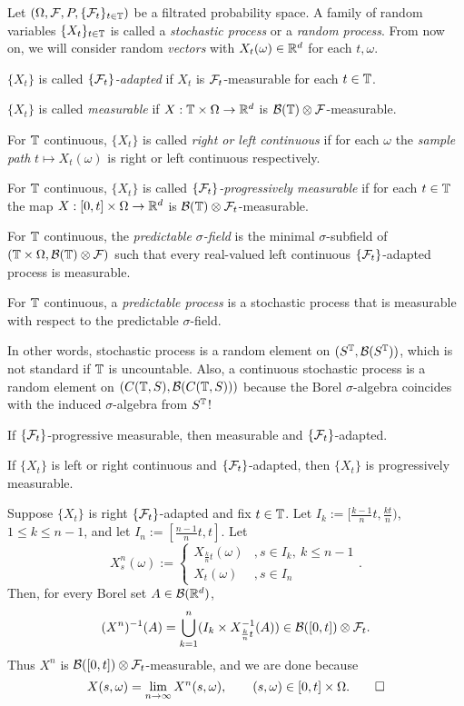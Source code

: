 \documentclass{../../../small}
\begin{document}
\begin{defn}
Let $(\Omega,\mathcal{F},P,\{\mathcal{F}_t\}_{t\in\mathbb{T}})$ be a filtrated probability space.
A family of random variables $\{X_t\}_{t\in\mathbb{T}}$ is called a \emph{stochastic process} or a \emph{random process}.
From now on, we will consider random \emph{vectors} with $X_t(\omega)\in\mathbb{R}^d$ for each $t,\omega$.
\begin{parts}
\item $\{X_t\}$ is called \emph{$\{\mathcal{F}_t\}$-adapted} if $X_t$ is $\mathcal{F}_t$-measurable for each $t\in\mathbb{T}$.
\item $\{X_t\}$ is called \emph{measurable} if $X:\mathbb{T}\times\Omega\to\mathbb{R}^d$ is $\mathcal{B}(\mathbb{T})\otimes\mathcal{F}$-measurable.
\item For $\mathbb{T}$ continuous, $\{X_t\}$ is called \emph{right or left continuous} if for each $\omega$ the \emph{sample path} $t\mapsto X_t(\omega)$ is right or left continuous respectively.
\item For $\mathbb{T}$ continuous, $\{X_t\}$ is called \emph{$\{\mathcal{F}_t\}$-progressively measurable} if for each $t\in\mathbb{T}$ the map $X:[0,t]\times\Omega\to\mathbb{R}^d$ is $\mathcal{B}(\mathbb{T})\otimes\mathcal{F}_t$-measurable.
\item For $\mathbb{T}$ continuous, the \emph{predictable $\sigma$-field} is the minimal $\sigma$-subfield of $(\mathbb{T}\times\Omega,\mathcal{B}(\mathbb{T})\otimes\mathcal{F})$ such that every real-valued left continuous $\{\mathcal{F}_t\}$-adapted process is measurable.
\item For $\mathbb{T}$ continuous, a \emph{predictable process} is a stochastic process that is measurable with respect to the predictable $\sigma$-field.
\end{parts}
\end{defn}
\begin{rmk*}
In other words, stochastic process is a random element on $(S^{\mathbb{T}},\mathcal{B}(S^{\mathbb{T}}))$, which is not standard if $\mathbb{T}$ is uncountable.
Also, a continuous stochastic process is a random element on $(C(\mathbb{T},S),\mathcal{B}(C(\mathbb{T},S)))$ because the Borel $\sigma$-algebra coincides with the induced $\sigma$-algebra from $S^{\mathbb{T}}$!
\end{rmk*}


If $\{\mathcal{F}_t\}$-progressive measurable, then measurable and $\{\mathcal{F}_t\}$-adapted.
\setcounter{thm}{4}
\begin{prop}
If $\{X_t\}$ is left or right continuous and $\{\mathcal{F}_t\}$-adapted, then $\{X_t\}$ is progressively measurable.
\end{prop}
\begin{pf}
Suppose $\{X_t\}$ is right $\{\mathcal{F}_t\}$-adapted and fix $t\in\mathbb{T}$.
Let $I_k:=[\frac{k-1}nt,\frac{kt}n)$, $1\le k\le n-1$, and let $I_n:=[\frac{n-1}nt,t]$.
Let
\[X_s^n(\omega):=\begin{cases}X_{\frac knt}(\omega)&,s\in I_k,\ k\le n-1\\X_t(\omega)&,s\in I_n\end{cases}.\]
Then, for every Borel set $A\in\mathcal{B}(\mathbb{R}^d)$,
\[(X^n)^{-1}(A)=\bigcup_{k=1}^n(I_k\times X_{\frac knt}^{-1}(A))\in\mathcal{B}([0,t])\otimes\mathcal{F}_t.\]
Thus $X^n$ is $\mathcal{B}([0,t])\otimes\mathcal{F}_t$-measurable, and we are done because
\[X(s,\omega)=\lim_{n\to\infty}X^n(s,\omega),\qquad(s,\omega)\in[0,t]\times\Omega.\qedhere\]
\end{pf}
\end{document}
